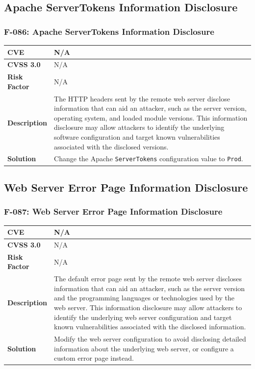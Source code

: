 %
%
\subsection{Apache ServerTokens Information Disclosure}

\subsubsection{F-086: Apache ServerTokens Information Disclosure}
\begin{tabular}{|p{2.8cm}|p{12.2cm}|}
\hline
\textbf{CVE} & N/A \\ \hline
\textbf{CVSS 3.0} & N/A \\ \hline
\textbf{Risk Factor} & N/A \\ \hline
\textbf{Description} & The HTTP headers sent by the remote web server disclose information that can aid an attacker, such as the server version, operating system, and loaded module versions. This information disclosure may allow attackers to identify the underlying software configuration and target known vulnerabilities associated with the disclosed versions. \\ \hline
\textbf{Solution} & Change the Apache \texttt{ServerTokens} configuration value to \texttt{Prod}. \\ \hline
\end{tabular}

%
%
\subsection{Web Server Error Page Information Disclosure}

\subsubsection{F-087: Web Server Error Page Information Disclosure}
\begin{tabular}{|p{2.8cm}|p{12.2cm}|}
\hline
\textbf{CVE} & N/A \\ \hline
\textbf{CVSS 3.0} & N/A \\ \hline
\textbf{Risk Factor} & N/A \\ \hline
\textbf{Description} & The default error page sent by the remote web server discloses information that can aid an attacker, such as the server version and the programming languages or technologies used by the web server. This information disclosure may allow attackers to identify the underlying web server configuration and target known vulnerabilities associated with the disclosed information. \\ \hline
\textbf{Solution} & Modify the web server configuration to avoid disclosing detailed information about the underlying web server, or configure a custom error page instead. \\ \hline
\end{tabular}

